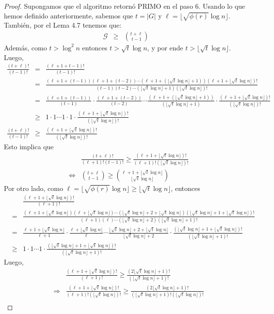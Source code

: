 \documentclass[10pt]{article}
\newcommand{\0}{\mathbf{0}}
\newcommand{\1}{\mathbf{1}}
\newcommand{\mia}{\lfloor\sqrt{t}\log  n\rfloor}
\newcommand{\+}{\oplus}
\newcommand{\comentario}[1]{}
\theoremstyle{remark}
\theoremstyle{remark}
\begin{document}
	\begin{proof}
	Supongamos que el algoritmo retornó PRIMO en el paso 6. Usando lo que hemos definido anteriormente, sabemos que $t=|G|$ y $\ell  = \lfloor \sqrt{\phi(r)}\log  n\rfloor$. También, por el Lema 4.7 \comentario{referenciar lema} tenemos que:
	\begin{eqnarray}
		\mathcal{G}&\geq &{{t+\ell }\choose{t-1}}\label{eq:10}
	\end{eqnarray}
	Además, como $t>\log ^2 n$ entonces $t>\sqrt{t}\log  n$, y por ende $t>\mia$. Luego,
	\begin{eqnarray}
		\frac{(t+\ell )!}{(t-1)!} &=& \frac{(\ell +1+t-1)!}{(t-1)!}\nonumber\\
		&=&\frac{(\ell +1+(t-1))(\ell +1+(t-2))\cdots(\ell +1+(\mia+1))(\ell +1+\mia)!}{(t-1)(t-2)\cdots (\mia+1)(\mia)!}\nonumber\\
		&=& \frac{(\ell +1+(t-1))}{(t-1)}\cdot\frac{(\ell +1+(t-2))}{(t-2)}\cdots\frac{(\ell +1+(\mia+1))}{(\mia+1)}\cdot\frac{(\ell +1+\mia)!}{(\mia)!}\nonumber\\
		&\geq & 1\cdot1\cdots1\cdot1\cdot\frac{(\ell +1+\mia)!}{(\mia)!}\nonumber\\
		\frac{(t+\ell )!}{(t-1)!} &\geq & \frac{(\ell +1+\mia)!}{(\mia)!}\nonumber
	\end{eqnarray}
Esto implica que 
\begin{eqnarray}
	& &\frac{(t+\ell )!}{(\ell +1)!(t-1)!} \geq \frac{(\ell +1+\mia)!}{(\ell +1)!(\mia)!}\nonumber\\
	&\Leftrightarrow &{{t+\ell }\choose{t-1}}\geq {{\ell +1+\mia}\choose{\mia}}\label{eq:11}
\end{eqnarray}	
Por otro lado, como $\ell =\lfloor \sqrt{\phi(r)}\log  n\rfloor\geq \mia$, entonces
\begin{eqnarray}
	& &\frac{(\ell +1+\mia)!}{(\ell +1)!}\nonumber\\
	&= &\frac{(\ell +1+\mia)(\ell +\mia)\cdots (\mia+2+\mia)(\mia+1+\mia)!}{(\ell +1)(\ell )\cdots (\mia+2)(\mia+1)!}\nonumber\\
	&= &\frac{\ell +1+\mia}{\ell +1}\cdot\frac{\ell +\mia}{\ell }\cdots\frac{\mia+2+\mia}{\mia+2}\cdot\frac{(\mia+1+\mia)!}{(\mia+1)!}\nonumber\\
	&\geq &1\cdot 1\cdots 1 \cdot\frac{(\mia+1+\mia)!}{(\mia+1)!}\nonumber
\end{eqnarray}
Luego, 
\begin{eqnarray}
	& &\frac{(\ell +1+\mia)!}{(\ell +1)!}\geq \frac{(2\mia+1)!}{(\mia+1)!}\nonumber\\
	&\Rightarrow &\frac{(\ell +1+\mia)!}{(\ell +1)!(\mia)!}\geq \frac{(2\mia+1)!}{(\mia+1)!(\mia)!}\nonumber\\

\end{eqnarray}
\end{proof}
\end{document}
